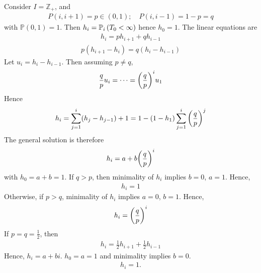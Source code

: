 \begin{example}
	Consider $I = \mathbb{Z}_+$, and
	\begin{align*}
		P(i, i+1) = p \in (0,1);\quad P(i, i-1) = 1-p = q
	\end{align*} with $\mathbb{P}(0, 1) = 1$.
	Then $h_i = \mathbb{P}_{i}\left({T_0 < \infty}\right)$ hence $h_0 = 1$.
	The linear equations are
	\begin{align*}
		h_i = p h_{i+1} + q h_{i-1}
	\end{align*}
	\begin{align*}
		p(h_{i+1} - h_i) = q(h_i - h_{i-1})
	\end{align*}
	Let $u_i = h_i - h_{i-1}$.
	Then assuming $p \neq q$,
	\begin{align*}
		\frac{q}{p} u_i = \dots = \qty(\frac{q}{p})^i u_1
	\end{align*}
	Hence
	\begin{align*}
		h_i = \sum_{j=1}^i (h_j - h_{j-1}) + 1 = 1 - (1-h_1) \sum_{j=1}^i \qty(\frac{q}{p})^j
	\end{align*}
	The general solution is therefore
	\begin{align*}
		h_i = a + b \qty(\frac{q}{p})^i
	\end{align*} with $h_0 = a + b = 1$.
	If $q > p$, then minimality of $h_i$ implies $b = 0$, $a = 1$.
	Hence,
	\begin{align*}
		h_i = 1
	\end{align*}
	Otherwise, if $p > q$, minimality of $h_i$ implies $a = 0$, $b = 1$.
	Hence,
	\begin{align*}
		h_i = \qty(\frac{q}{p})^i
	\end{align*}
	If $p = q = \frac{1}{2}$, then
	\begin{align*}
		h_i = \frac{1}{2} h_{i+1} + \frac{1}{2} h_{i-1}
	\end{align*}
	Hence, $h_i = a + bi$.
	$h_0 = a = 1$ and minimality implies $b = 0$.
	\begin{align*}
		h_i = 1.
	\end{align*}
\end{example}

